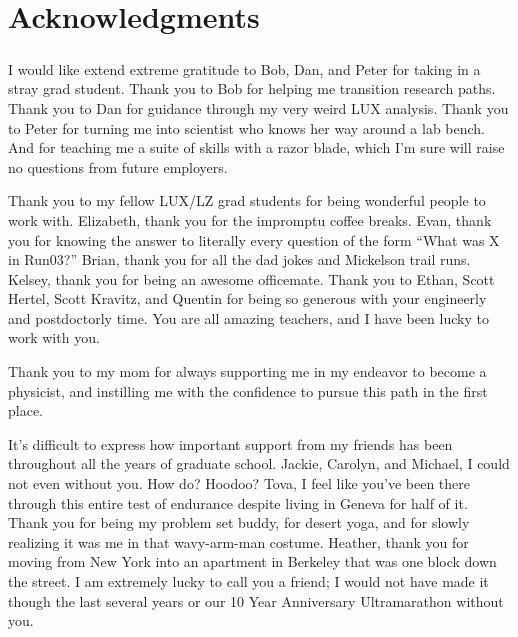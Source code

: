 

\bigskip


\begingroup

\let\clearpage\relax
\let\cleardoublepage\relax
\let\cleardoublepage\relax

\chapter*{Acknowledgments}

\paragraph{} I would like extend extreme gratitude to Bob, Dan, and Peter for taking in a stray grad student. Thank you to Bob for helping me transition research paths. Thank you to Dan for guidance through my very weird LUX analysis. Thank you to Peter for turning me into scientist who knows her way around a lab bench. And for teaching me a suite of skills with a razor blade, which I'm sure will raise no questions from future employers. %

Thank you to my fellow LUX/LZ grad students for being wonderful people to work with. Elizabeth, thank you for the impromptu coffee breaks. Evan, thank you for knowing the answer to literally every question of the form ``What was X in Run03?''  Brian, thank you for all the dad jokes and Mickelson trail runs. Kelsey, thank you for being an awesome officemate. Thank you to Ethan, Scott Hertel, Scott Kravitz, and Quentin for being so generous with your engineerly and postdoctorly time. You are all amazing teachers, and I have been lucky to work with you.     %

Thank you to my mom for always supporting me in my endeavor to become a physicist, and instilling me with the confidence to pursue this path in the first place. %

It's difficult to express how important support from my friends has been throughout all the years of graduate school. Jackie, Carolyn, and Michael, I could not even without you. How do? Hoodoo? Tova, I feel like you've been there through this entire test of endurance despite living in Geneva for half of it. Thank you for being my problem set buddy, for desert yoga, and for slowly realizing it was me in that wavy-arm-man costume. Heather, thank you for moving from New York into an apartment in Berkeley that was one block down the street. I am extremely lucky to call you a friend; I would not have made it though the last several years or our 10 Year Anniversary Ultramarathon without you. %

